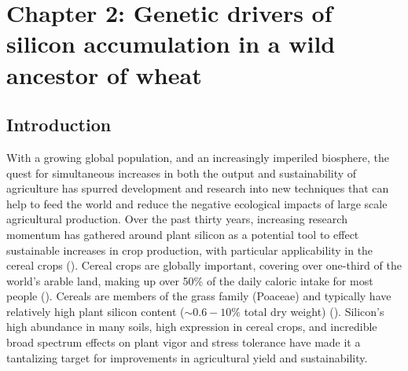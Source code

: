 \documentclass[12pt, letterpaper, ]{report}
\begin{document}
\clearpage



\chapter{Chapter 2: Genetic drivers of silicon accumulation in a wild ancestor of wheat}

\section{Introduction}

With a growing global population, and an increasingly imperiled biosphere, the quest for simultaneous increases in both the output and sustainability of agriculture has spurred development and research into new techniques that can help to feed the world and reduce the negative ecological impacts of large scale agricultural production. Over the past thirty years, increasing research momentum has gathered around plant silicon as a potential tool to effect sustainable increases in crop production, with particular applicability in the cereal crops (\cite{reynolds_silicon_2016,christian_breeding_2022}). Cereal crops are globally important, covering over one-third of the world’s arable land, making up over 50\% of the daily caloric intake for most people (\cite{faostat, rudel_agricultural_2009, awika_major_2011}). Cereals are members of the grass family (Poaceae) and typically have relatively high plant silicon content ($\sim0.6 - 10\%$ total dry weight) (\cite{reynolds_silicon_2016}). Silicon's high abundance in many soils, high expression in cereal crops, and incredible broad spectrum effects on plant vigor and stress tolerance have made it a tantalizing target for improvements in agricultural yield and sustainability. 
\end{document}
